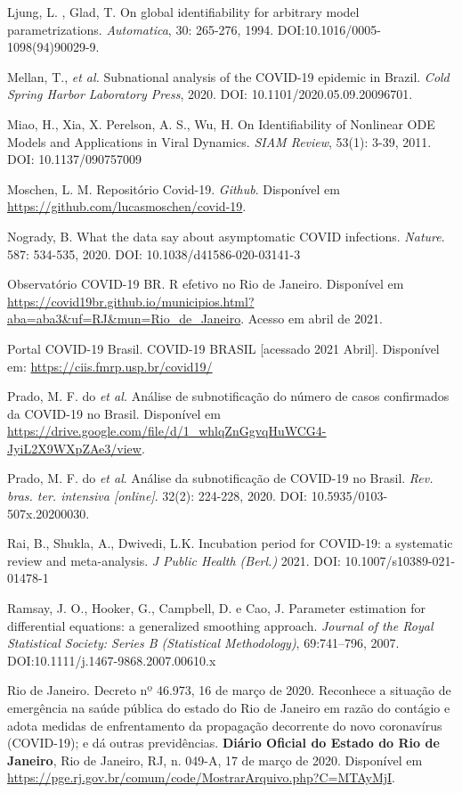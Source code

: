Ljung, L. , Glad, T. On global identifiability for arbitrary model
parametrizations. {\it Automatica}, 30: 265-276, 1994.
DOI:10.1016/0005-1098(94)90029-9.

Mellan, T., {\it et al.} Subnational analysis of the COVID-19 epidemic in
Brazil. {\it Cold Spring Harbor Laboratory Press}, 2020. DOI:
10.1101/2020.05.09.20096701. 

Miao, H., Xia, X. Perelson, A. S., Wu, H. On Identifiability of Nonlinear ODE Models and Applications in Viral Dynamics.
{\it SIAM Review}, 53(1): 3-39, 2011. DOI: 10.1137/090757009

Moschen, L. M. Repositório Covid-19. {\it Github}. Disponível em \url{https://github.com/lucasmoschen/covid-19}.

Nogrady, B. What the data say about asymptomatic COVID infections. {\it
Nature}. 587: 534-535, 2020. DOI: 10.1038/d41586-020-03141-3

Observatório COVID-19 BR. R efetivo no Rio de Janeiro. Disponível em
\url{https://covid19br.github.io/municipios.html?aba=aba3&uf=RJ&mun=Rio_de_Janeiro}.
Acesso em abril de 2021. 

Portal COVID-19 Brasil. COVID-19 BRASIL [acessado 2021 Abril]. Disponível em: \url{https://ciis.fmrp.usp.br/covid19/}

Prado, M. F. do {\it et al.} Análise de subnotificação do número de casos confirmados da COVID-19 no
Brasil. Disponível em
\url{https://drive.google.com/file/d/1_whlqZnGgvqHuWCG4-JyiL2X9WXpZAe3/view}. 

Prado, M. F. do {\it et al}. Análise da subnotificação de COVID-19 no Brasil.
{\it Rev. bras. ter. intensiva [online]}. 32(2): 224-228, 2020. DOI: 10.5935/0103-507x.20200030.


Rai, B., Shukla, A., Dwivedi, L.K. Incubation period for COVID-19: a
systematic review and meta-analysis. {\it J Public Health (Berl.)} 2021. DOI: 10.1007/s10389-021-01478-1

Ramsay, J. O., Hooker, G., Campbell, D. e Cao, J. Parameter estimation for
differential equations: a generalized smoothing approach. {\it Journal of the
Royal Statistical Society: Series B (Statistical Methodology)}, 69:741--796,
2007. DOI:10.1111/j.1467-9868.2007.00610.x

Rio de Janeiro. Decreto nº 46.973, 16 de março de 2020. Reconhece a situação de emergência na saúde pública do estado do Rio de Janeiro em razão do contágio e adota medidas de enfrentamento da propagação decorrente do novo coronavírus (COVID-19); e dá outras previdências. {\bf Diário Oficial do Estado do Rio de Janeiro}, Rio de Janeiro, RJ, n. 049-A, 17 de março de 2020. Disponível em \url{https://pge.rj.gov.br/comum/code/MostrarArquivo.php?C=MTAyMjI}. 

